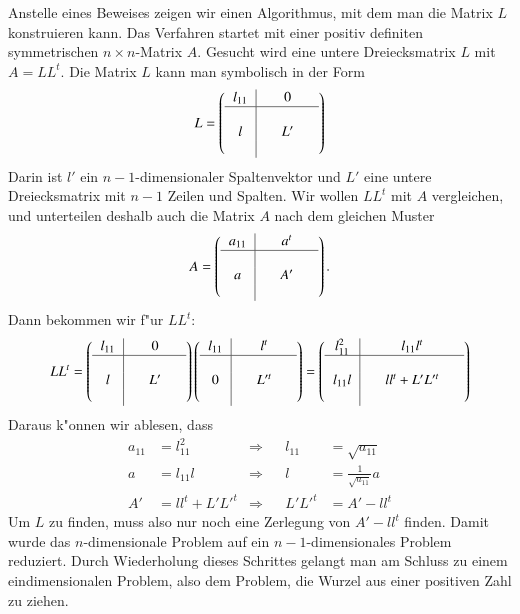 Anstelle eines Beweises zeigen wir einen Algorithmus, mit dem man die Matrix
$L$ konstruieren kann.
Das Verfahren startet mit einer positiv definiten
symmetrischen $n\times n$-Matrix $A$.
Gesucht wird eine untere Dreiecksmatrix $L$
mit $A=LL^t$.
Die Matrix $L$ kann man symbolisch in der Form 
\[
L=\left(
\begin{tabular}{>{$}c<{$}|>{$}c<{$}>{$}c<{$}>{$}c<{$}}
l_{11}&&0&\\
\hline
&&&\\
l&&L'&\\
&&&
\end{tabular}
\right)
\]
Darin ist $l'$ ein $n-1$-dimensionaler Spaltenvektor und $L'$ eine
untere Dreiecksmatrix mit $n-1$ Zeilen und Spalten.
Wir wollen $LL^t$ mit $A$ vergleichen, und unterteilen deshalb auch die
Matrix $A$ nach dem gleichen Muster
\[
A=\left(
\begin{tabular}{>{$}c<{$}|>{$}c<{$}>{$}c<{$}>{$}c<{$}}
a_{11}&&a^t&\\
\hline
&&&\\
a&&A'&\\
&&&
\end{tabular}
\right).
\]
Dann bekommen wir f"ur $LL^t$:
\[
LL^t=
\left(
\begin{tabular}{>{$}c<{$}|>{$}c<{$}>{$}c<{$}>{$}c<{$}}
l_{11}&&0&\\
\hline
&&&\\
l&&L'&\\
&&&
\end{tabular}
\right)
\left(
\begin{tabular}{>{$}c<{$}|>{$}c<{$}>{$}c<{$}>{$}c<{$}}
l_{11}&&l^t&\\
\hline
&&&\\
0&&L'^t&\\
&&&
\end{tabular}
\right)
=
\left(
\begin{tabular}{>{$}c<{$}|>{$}c<{$}>{$}c<{$}>{$}c<{$}}
l_{11}^2&&l_{11}l^t&\\
\hline
&&&\\
l_{11}l&&ll^t+L'L'^t&\\
&&&
\end{tabular}
\right)
\]
Daraus k"onnen wir ablesen, dass 
\begin{align*}
a_{11}&=l_{11}^2   &\Rightarrow&&l_{11}&=\sqrt{a_{11}}\\
     a&=l_{11}l    &\Rightarrow&&     l&=\frac1{\sqrt{a_{11}}}a\\
    A'&=ll^t+L'L'^t&\Rightarrow&&L'L'^t&=A'-ll^t
\end{align*}
Um $L$ zu finden, muss also nur noch eine Zerlegung von $A'-ll^t$
finden.
Damit wurde das $n$-dimensionale Problem auf ein $n-1$-dimensionales
Problem reduziert.
Durch Wiederholung dieses Schrittes gelangt man am Schluss
zu einem eindimensionalen Problem, also dem Problem, die Wurzel aus einer
positiven Zahl zu ziehen.

